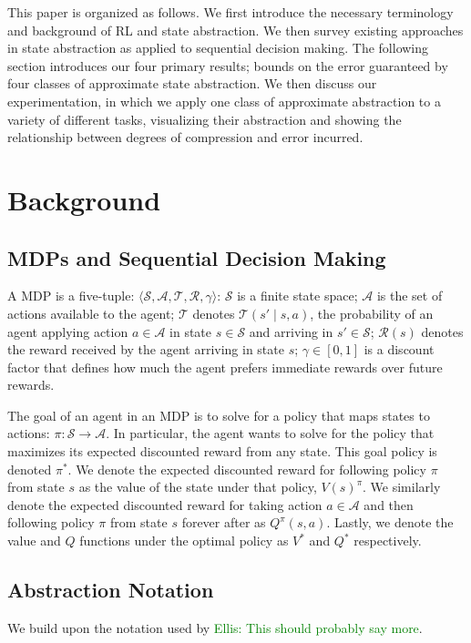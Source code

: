 \documentclass{article}
\newcommand\enote[1]{\textcolor{green}{Ellis: #1}}
\begin{document}
This paper is organized as follows. We first introduce the necessary terminology and background of \ac{RL} and state abstraction. We then survey existing approaches in state abstraction as applied to sequential decision making. The following section introduces our four primary results; bounds on the error guaranteed by four classes of approximate state abstraction. We then discuss our experimentation, in which we apply one class of approximate abstraction to a variety of different tasks, visualizing their abstraction and showing the relationship between degrees of compression and error incurred.


\section{Background}

\subsection{\acp{MDP} and Sequential Decision Making}
A \ac{MDP} is a five-tuple: $\langle \mathcal{S}, \mathcal{A}, \mathcal{T}, \mathcal{R}, \gamma \rangle$: $\mathcal{S}$ is a finite state space; $\mathcal{A}$ is the set of actions available to the agent; $\mathcal{T}$ denotes $\mathcal{T}(s' \mid s,a)$, the probability of an agent applying action $a \in \mathcal{A}$ in state $s \in \mathcal{S}$ and arriving in $s' \in \mathcal{S}$; $\mathcal{R}(s)$ denotes the reward received by the agent arriving in state $s$; $\gamma \in [0, 1]$ is a discount  factor that defines how much the agent prefers immediate rewards over future rewards.

The goal of an agent in an \ac{MDP} is to solve for a policy that maps states to actions: $\pi: \mathcal{S} \rightarrow \mathcal{A}$. In particular, the agent wants to solve for the policy that maximizes its expected discounted reward from any state. This goal policy is denoted $\pi^*$. We denote the expected discounted reward for following policy $\pi$ from state $s$ as the value of the state under that policy, $V(s)^\pi$. We similarly denote the expected discounted reward for taking action $a \in \mathcal{A}$ and then following policy $\pi$ from state $s$ forever after as $Q^\pi(s,a)$. Lastly, we denote the value and $Q$ functions under the optimal policy as $V^*$ and $Q^*$ respectively.

\subsection{Abstraction Notation}
We build upon the notation used by \cite{li2006towards} \enote{This should probably say more}.
\end{document}
